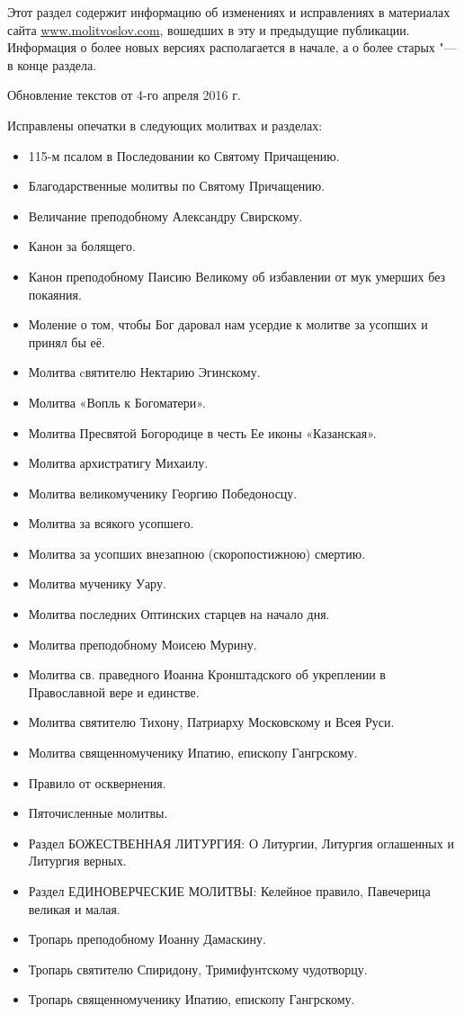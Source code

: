 \renewcommand{\ornament}{uzor_begin_9}

Этот раздел содержит информацию об изменениях и исправлениях в материалах сайта \url{www.molitvoslov.com}, вошедших в эту и предыдущие публикации. Информация о более новых версиях располагается в начале, а о более старых "--- в конце раздела.


Обновление текстов от 4-го апреля 2016 г.

Исправлены опечатки в следующих молитвах и разделах:

\begin{itemize}

\item 115-м псалом в Последовании ко Святому Причащению.
\item Благодарственные молитвы по Святому Причащению.
\item Величание преподобному Александру Свирскому.
\item Канон за болящего.
\item Канон преподобному Паисию Великому об избавлении от мук умерших без покаяния.
\item Моление о том, чтобы Бог даровал нам усердие к молитве за усопших и принял бы её.
\item Молитва cвятителю Нектарию Эгинскому.
\item Молитва «Вопль к Богоматери».
\item Молитва Пресвятой Богородице в честь Ее иконы «Казанская».
\item Молитва архистратигу Михаилу.
\item Молитва великомученику Георгию Победоносцу.
\item Молитва за всякого усопшего.
\item Молитва за усопших внезапною (скоропостижною) смертию.
\item Молитва мученику Уару.
\item Молитва последних Оптинских старцев на начало дня.
\item Молитва преподобному Моисею Мурину.
\item Молитва св. праведного Иоанна Кронштадского об укреплении в Православной вере и единстве.
\item Молитва святителю Тихону, Патриарху Московскому и Всея Руси.
\item Молитва священномученику Ипатию, епископу Гангрскому.
\item Правило от осквернения.
\item Пяточисленные молитвы.
\item Раздел БОЖЕСТВЕННАЯ ЛИТУРГИЯ: О Литургии, Литургия оглашенных и Литургия верных.
\item Раздел ЕДИНОВЕРЧЕСКИЕ МОЛИТВЫ: Келейное правило, Павечерица великая и малая.
\item Тропарь преподобному Иоанну Дамаскину.
\item Тропарь святителю Спиридону, Тримифунтскому чудотворцу.
\item Тропарь священномученику Ипатию, епископу Гангрскому.

\end{itemize}

